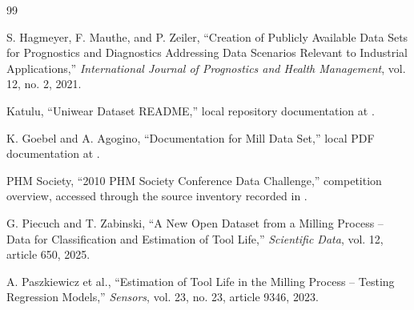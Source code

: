 \documentclass[11pt,a4paper]{article}
\begin{document}
\begin{thebibliography}{99}

S. Hagmeyer, F. Mauthe, and P. Zeiler,
``Creation of Publicly Available Data Sets for Prognostics and Diagnostics Addressing Data Scenarios Relevant to Industrial Applications,''
\emph{International Journal of Prognostics and Health Management}, vol. 12, no. 2, 2021.

Katulu,
``Uniwear Dataset README,''
local repository documentation at .

K. Goebel and A. Agogino,
``Documentation for Mill Data Set,''
local PDF documentation at .

PHM Society,
``2010 PHM Society Conference Data Challenge,''
competition overview, accessed through the source inventory recorded in .

G. Piecuch and T. Zabinski,
``A New Open Dataset from a Milling Process -- Data for Classification and Estimation of Tool Life,''
\emph{Scientific Data}, vol. 12, article 650, 2025.

A. Paszkiewicz et al.,
``Estimation of Tool Life in the Milling Process -- Testing Regression Models,''
\emph{Sensors}, vol. 23, no. 23, article 9346, 2023.

\end{thebibliography}
\end{document}
